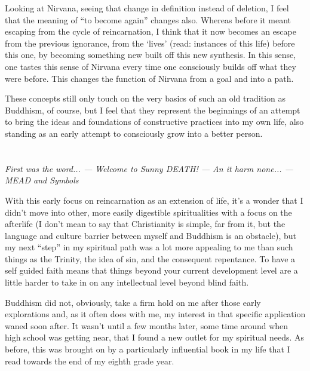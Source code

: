 \documentclass{book}
\begin{document}
Looking at Nirvana, seeing that change in definition instead of deletion, I feel that the meaning of ``to become again'' changes also.  Whereas before it meant escaping from the cycle of reincarnation, I think that it now becomes an escape from the previous ignorance, from the `lives' (read: instances of this life) before this one, by becoming something new built off this new synthesis.  In this sense, one tastes this sense of Nirvana every time one consciously builds off what they were before.  This changes the function of Nirvana from a goal and into a path.

These concepts still only touch on the very basics of such an old tradition as Buddhism, of course, but I feel that they represent the beginnings of an attempt to bring the ideas and foundations of constructive practices into my own life, also standing as an early attempt to consciously grow into a better person.

\chapter{}
\begin{center}
	\emph{First was the word...  --- Welcome to Sunny DEATH! --- An it harm none...  --- MEAD and Symbols}	
\end{center}

With this early focus on reincarnation as an extension of life, it's a
wonder that I didn't move into other, more easily digestible
spiritualities with a focus on the afterlife (I don't mean to say that
Christianity is simple, far from it, but the language and culture
barrier between myself and Buddhism is an obstacle), but my next
``step'' in my spiritual path was a lot more appealing to me than such
things as the Trinity, the idea of sin, and the consequent repentance.
To have a self guided faith means that things beyond your current
development level are a little harder to take in on any intellectual
level beyond blind faith.

Buddhism did not, obviously, take a firm hold on me after those early
explorations and, as it often does with me, my interest in that specific
application waned soon after.  It wasn't until a few months later, some
time around when high school was getting near, that I found a new outlet
for my spiritual needs.  As before, this was brought on by a
particularly influential book in my life that I read towards the end of
my eighth grade year.
\end{document}
